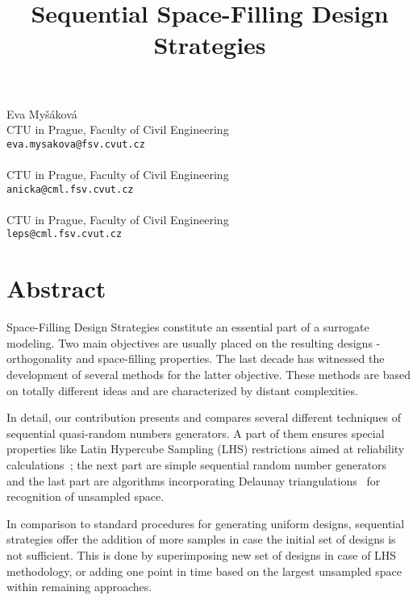 \title{Sequential Space-Filling Design Strategies}
 \author{} \institute{}
\maketitle
\begin{center}
{\large Eva My\v{s}\'akov\'a}\\
CTU in Prague, Faculty of Civil Engineering\\
{\tt eva.mysakova@fsv.cvut.cz}
\\ \\
CTU in Prague, Faculty of Civil Engineering\\
{\tt anicka@cml.fsv.cvut.cz}
\\ \\
CTU in Prague, Faculty of Civil Engineering\\
{\tt leps@cml.fsv.cvut.cz}

\end{center}

\section*{Abstract}

Space-Filling Design Strategies constitute an essential part of a surrogate
modeling. Two main objectives are usually placed on the resulting designs - orthogonality
and space-filling properties. The last decade has witnessed the development
of several methods for the latter objective. These methods are based on totally
different ideas and are characterized by distant complexities.

In detail, our contribution presents and compares several different techniques of sequential quasi-random numbers generators.
A part of them ensures special properties like Latin Hypercube Sampling (LHS) restrictions aimed at reliability calculations~\cite{Vor:HSLHS:Madeira:09}; the next part are simple sequential random number generators~\cite{Maaranen:2007} and the last part are algorithms incorporating Delaunay triangulations~\cite{Crombecq:2009} for recognition of unsampled space.

In comparison to standard procedures for generating uniform designs, sequential strategies offer the addition of more samples in case the initial set of designs is not sufficient. This is done by superimposing new set of designs in case of LHS methodology, or adding one point in time based on the largest unsampled space within remaining approaches.

